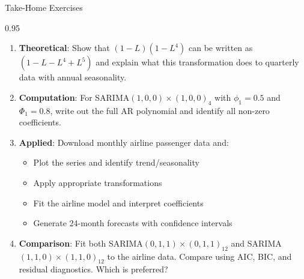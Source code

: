 \documentclass[9pt, aspectratio=169, t]{beamer}
\begin{document}
\begin{frame}{Take-Home Exercises}
    \begin{cminipage}{0.95\textwidth}
    {\small
    \begin{enumerate}
        \item \textbf{Theoretical}: Show that $(1-L)(1-L^4)$ can be written as $(1 - L - L^4 + L^5)$ and explain what this transformation does to quarterly data with annual seasonality.

        \vspace{0.2cm}
        \item \textbf{Computation}: For SARIMA$(1,0,0) \times (1,0,0)_4$ with $\phi_1 = 0.5$ and $\Phi_1 = 0.8$, write out the full AR polynomial and identify all non-zero coefficients.

        \vspace{0.2cm}
        \item \textbf{Applied}: Download monthly airline passenger data and:
            \begin{itemize}\setlength{\itemsep}{0pt}
                \item Plot the series and identify trend/seasonality
                \item Apply appropriate transformations
                \item Fit the airline model and interpret coefficients
                \item Generate 24-month forecasts with confidence intervals
            \end{itemize}

        \vspace{0.2cm}
        \item \textbf{Comparison}: Fit both SARIMA$(0,1,1) \times (0,1,1)_{12}$ and SARIMA$(1,1,0) \times (1,1,0)_{12}$ to the airline data. Compare using AIC, BIC, and residual diagnostics. Which is preferred?
    \end{enumerate}
    }
    \end{cminipage}
\end{frame}
\end{document}
